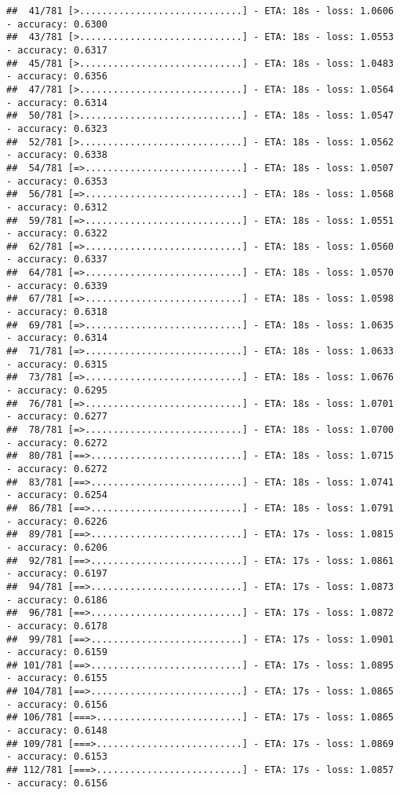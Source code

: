 \documentclass[
]{article}
\begin{document}
\begin{verbatim}
##  41/781 [>.............................] - ETA: 18s - loss: 1.0606 - accuracy: 0.6300
##  43/781 [>.............................] - ETA: 18s - loss: 1.0553 - accuracy: 0.6317
##  45/781 [>.............................] - ETA: 18s - loss: 1.0483 - accuracy: 0.6356
##  47/781 [>.............................] - ETA: 18s - loss: 1.0564 - accuracy: 0.6314
##  50/781 [>.............................] - ETA: 18s - loss: 1.0547 - accuracy: 0.6323
##  52/781 [>.............................] - ETA: 18s - loss: 1.0562 - accuracy: 0.6338
##  54/781 [=>............................] - ETA: 18s - loss: 1.0507 - accuracy: 0.6353
##  56/781 [=>............................] - ETA: 18s - loss: 1.0568 - accuracy: 0.6312
##  59/781 [=>............................] - ETA: 18s - loss: 1.0551 - accuracy: 0.6322
##  62/781 [=>............................] - ETA: 18s - loss: 1.0560 - accuracy: 0.6337
##  64/781 [=>............................] - ETA: 18s - loss: 1.0570 - accuracy: 0.6339
##  67/781 [=>............................] - ETA: 18s - loss: 1.0598 - accuracy: 0.6318
##  69/781 [=>............................] - ETA: 18s - loss: 1.0635 - accuracy: 0.6314
##  71/781 [=>............................] - ETA: 18s - loss: 1.0633 - accuracy: 0.6315
##  73/781 [=>............................] - ETA: 18s - loss: 1.0676 - accuracy: 0.6295
##  76/781 [=>............................] - ETA: 18s - loss: 1.0701 - accuracy: 0.6277
##  78/781 [=>............................] - ETA: 18s - loss: 1.0700 - accuracy: 0.6272
##  80/781 [==>...........................] - ETA: 18s - loss: 1.0715 - accuracy: 0.6272
##  83/781 [==>...........................] - ETA: 18s - loss: 1.0741 - accuracy: 0.6254
##  86/781 [==>...........................] - ETA: 18s - loss: 1.0791 - accuracy: 0.6226
##  89/781 [==>...........................] - ETA: 17s - loss: 1.0815 - accuracy: 0.6206
##  92/781 [==>...........................] - ETA: 17s - loss: 1.0861 - accuracy: 0.6197
##  94/781 [==>...........................] - ETA: 17s - loss: 1.0873 - accuracy: 0.6186
##  96/781 [==>...........................] - ETA: 17s - loss: 1.0872 - accuracy: 0.6178
##  99/781 [==>...........................] - ETA: 17s - loss: 1.0901 - accuracy: 0.6159
## 101/781 [==>...........................] - ETA: 17s - loss: 1.0895 - accuracy: 0.6155
## 104/781 [==>...........................] - ETA: 17s - loss: 1.0865 - accuracy: 0.6156
## 106/781 [===>..........................] - ETA: 17s - loss: 1.0865 - accuracy: 0.6148
## 109/781 [===>..........................] - ETA: 17s - loss: 1.0869 - accuracy: 0.6153
## 112/781 [===>..........................] - ETA: 17s - loss: 1.0857 - accuracy: 0.6156

\end{verbatim}
\end{document}
